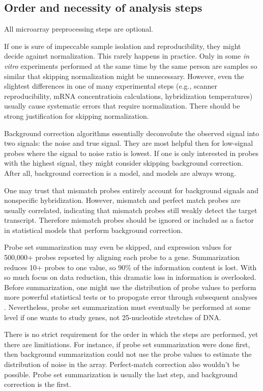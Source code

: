 \subsection{Order and necessity of analysis steps}\label{introjtm:steporder}

All microarray preprocessing steps are optional.
 
If one is sure of impeccable sample isolation and
reproducibility, they might decide against normalization. 
This rarely happens in practice. Only in some
\textit{in vitro} experiments performed at the same time by the same person
are samples so similar that skipping normalization might be unnecessary.
However, even the slightest differences in one of many experimental steps 
(e.g., scanner reproducibility, mRNA concentratioin calculations, hybridization
temperatures) usually cause systematic errors that require normalization.
There should be strong justification for skipping normalization.

Background correction algorithms essentially deconvolute the observed
signal into two signals: the noise and true signal.
They are most helpful then for low-signal probes where
the signal to noise ratio is lowest. If one is only interested in
probes with the highest signal, they might consider skipping
background correction. After all, background correction is a model, and models
are always wrong.

One may trust that mismatch probes entirely account for
background signals and nonspecific hybridization. 
However, mismatch and perfect match
probes are usually correlated, indicating that mismatch probes still
weakly detect the target transcript. Therefore mismatch probes should
be ignored or included as a factor in statistical models that perform
background correction.

Probe set summarization may even be skipped, and expression values
for 500,000+ probes reported by aligning each probe to a gene. Summarization
reduces 10+ probes to one value, so 90\% of the information content
is lost. With so much focus on data reduction, this
dramatic loss in information is overlooked. Before summarization, one might use
the distribution of probe values to perform more powerful statistical tests or to propogate
error through subsequent analyses \cite{Milo:2003tt,Liu:2005ey}.
Nevertheless, probe set summarization must eventually be performed
at some level if one wants to study genes, not 25-nucleotide stretches of DNA.

There is no strict requirement for the order in which the steps are performed,
yet there are limitiations. For instance, if probe set summarization were done first,
then background summarization could not use the probe values to estimate
the distribution of noise in the array. Perfect-match correction also wouldn't
be possible. Probe set summarization is usually the last step, and background
correction is the first.

